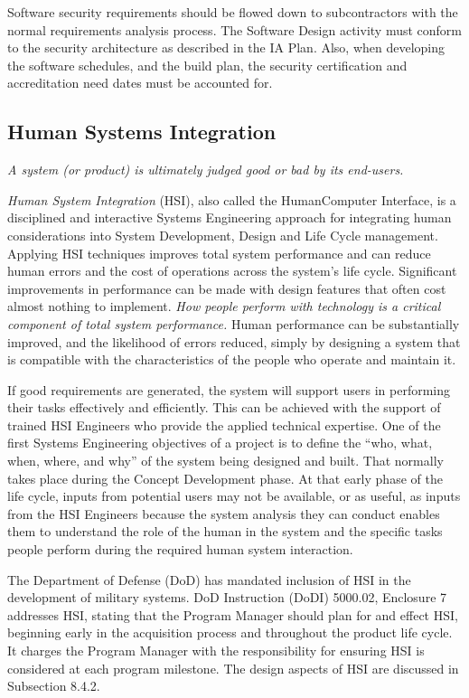 Software security requirements should be flowed down
to subcontractors with the normal requirements analysis
process. The Software Design activity must conform to the
security architecture as described in the IA Plan. Also, when
developing the software schedules, and the build plan, the
security certification and accreditation need dates must be
accounted for.

\subsection{Human Systems Integration}

\textit{A system (or product) is ultimately judged good or
bad by its end-users.}

\textit{Human System Integration} (HSI), also called the HumanComputer Interface, is a disciplined and interactive Systems
Engineering approach for integrating human considerations
into System Development, Design and Life Cycle management. Applying HSI techniques improves total system
performance and can reduce human errors and the cost of
operations across the system’s life cycle. Significant improvements in performance can be made with design features that
often cost almost nothing to implement. \textit{How people perform
with technology is a critical component of total system performance.} Human performance can be substantially improved,
and the likelihood of errors reduced, simply by designing
a system that is compatible with the characteristics of the
people who operate and maintain it.

If good requirements are generated, the system will
support users in performing their tasks effectively and efficiently. This can be achieved with the support of trained HSI
Engineers who provide the applied technical expertise. One
of the first Systems Engineering objectives of a project is to
define the “who, what, when, where, and why” of the system
being designed and built. That normally takes place during
the Concept Development phase. At that early phase of the
life cycle, inputs from potential users may not be available,
or as useful, as inputs from the HSI Engineers because the
system analysis they can conduct enables them to understand the role of the human in the system and the specific
tasks people perform during the required human system
interaction.

The Department of Defense (DoD) has mandated inclusion of HSI in the development of military systems. DoD
Instruction (DoDI) 5000.02, Enclosure 7 addresses HSI,
stating that the Program Manager should plan for and effect
HSI, beginning early in the acquisition process and throughout the product life cycle. It charges the Program Manager
with the responsibility for ensuring HSI is considered at each
program milestone. The design aspects of HSI are discussed
in Subsection 8.4.2.

